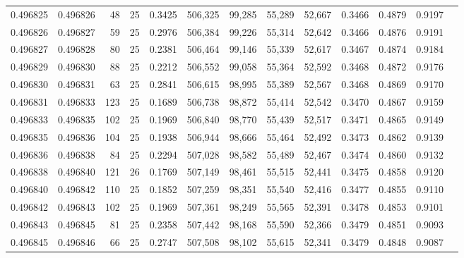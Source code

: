 \begin{tabular}{rrrrrrrrrrrrr}
0.496825 & 0.496826 &    48 &  25 &                                     0.3425 & 506,325 &  99,285 &  55,289 &  52,667 & 0.3466 & 0.4879 & 0.9197 \\
0.496826 & 0.496827 &    59 &  25 &                                     0.2976 & 506,384 &  99,226 &  55,314 &  52,642 & 0.3466 & 0.4876 & 0.9191 \\
0.496827 & 0.496828 &    80 &  25 &                                     0.2381 & 506,464 &  99,146 &  55,339 &  52,617 & 0.3467 & 0.4874 & 0.9184 \\
0.496829 & 0.496830 &    88 &  25 &                                     0.2212 & 506,552 &  99,058 &  55,364 &  52,592 & 0.3468 & 0.4872 & 0.9176 \\
0.496830 & 0.496831 &    63 &  25 &                                     0.2841 & 506,615 &  98,995 &  55,389 &  52,567 & 0.3468 & 0.4869 & 0.9170 \\
0.496831 & 0.496833 &   123 &  25 &                                     0.1689 & 506,738 &  98,872 &  55,414 &  52,542 & 0.3470 & 0.4867 & 0.9159 \\
0.496833 & 0.496835 &   102 &  25 &                                     0.1969 & 506,840 &  98,770 &  55,439 &  52,517 & 0.3471 & 0.4865 & 0.9149 \\
0.496835 & 0.496836 &   104 &  25 &                                     0.1938 & 506,944 &  98,666 &  55,464 &  52,492 & 0.3473 & 0.4862 & 0.9139 \\
0.496836 & 0.496838 &    84 &  25 &                                     0.2294 & 507,028 &  98,582 &  55,489 &  52,467 & 0.3474 & 0.4860 & 0.9132 \\
0.496838 & 0.496840 &   121 &  26 &                                     0.1769 & 507,149 &  98,461 &  55,515 &  52,441 & 0.3475 & 0.4858 & 0.9120 \\
0.496840 & 0.496842 &   110 &  25 &                                     0.1852 & 507,259 &  98,351 &  55,540 &  52,416 & 0.3477 & 0.4855 & 0.9110 \\
0.496842 & 0.496843 &   102 &  25 &                                     0.1969 & 507,361 &  98,249 &  55,565 &  52,391 & 0.3478 & 0.4853 & 0.9101 \\
0.496843 & 0.496845 &    81 &  25 &                                     0.2358 & 507,442 &  98,168 &  55,590 &  52,366 & 0.3479 & 0.4851 & 0.9093 \\
0.496845 & 0.496846 &    66 &  25 &                                     0.2747 & 507,508 &  98,102 &  55,615 &  52,341 & 0.3479 & 0.4848 & 0.9087 \\

\end{tabular}
